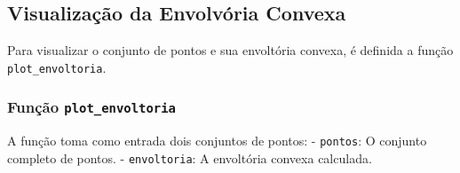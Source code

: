 \documentclass[11pt]{article}
\begin{document}
    \hypertarget{visualizauxe7uxe3o-da-envolvuxf3ria-convexa}{%
\subsection{Visualização da Envolvória
Convexa}\label{visualizauxe7uxe3o-da-envolvuxf3ria-convexa}}

Para visualizar o conjunto de pontos e sua envoltória convexa, é
definida a função \texttt{plot\_envoltoria}.

\hypertarget{funuxe7uxe3o-plot_envoltoria}{%
\subsubsection{\texorpdfstring{Função
\texttt{plot\_envoltoria}}{Função plot\_envoltoria}}\label{funuxe7uxe3o-plot_envoltoria}}

A função toma como entrada dois conjuntos de pontos: - \texttt{pontos}:
O conjunto completo de pontos. - \texttt{envoltoria}: A envoltória
convexa calculada.
\end{document}
